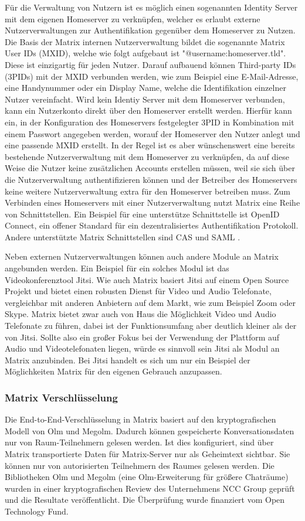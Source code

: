 Für die Verwaltung von Nutzern ist es möglich einen sogenannten Identity Server mit dem eigenen Homeserver zu verknüpfen, welcher es erlaubt externe Nutzerverwaltungen zur Authentifikation gegenüber dem Homeserver zu Nutzen. Die Basis der Matrix internen Nutzerverwaltung bildet die sogenannte Matrix User IDs (MXID), welche wie folgt aufgebaut ist "@username:homeserver.tld". Diese ist einzigartig für jeden Nutzer. Darauf aufbauend können Third-party IDs (3PIDs) mit der MXID verbunden werden, wie zum Beispiel eine E-Mail-Adresse, eine Handynummer oder ein Display Name, welche die Identifikation einzelner Nutzer vereinfacht. Wird kein Identiy Server mit dem Homeserver verbunden, kann ein Nutzerkonto direkt über den Homeserver erstellt werden. Hierfür kann ein, in der Konfiguration des Homeservers festgelegter 3PID in Kombination mit einem Passwort angegeben werden, worauf der Homeserver den Nutzer anlegt und eine passende MXID erstellt. In der Regel ist es aber wünschenswert eine bereits bestehende Nutzerverwaltung mit dem Homeserver zu verknüpfen, da auf diese Weise die Nutzer keine zusätzlichen Accounts erstellen müssen, weil sie sich über die Nutzerverwaltung authentifizieren können und der Betreiber des Homeservers keine weitere Nutzerverwaltung extra für den Homeserver betreiben muss. Zum Verbinden eines Homeservers mit einer Nutzerverwaltung nutzt Matrix eine Reihe von Schnittstellen. Ein Beispiel für eine unterstütze Schnittstelle ist OpenID Connect, ein offener Standard für ein dezentralisiertes Authentifikation Protokoll. Andere unterstützte Matrix Schnittstellen sind CAS und SAML .

Neben externen Nutzerverwaltungen können auch andere Module an Matrix angebunden werden. Ein Beispiel für ein solches Modul ist das Videokonferenztool Jitsi. Wie auch Matrix basiert Jitsi auf einem Open Source Projekt und bietet einen robusten Dienst für Video und Audio Telefonate, vergleichbar mit anderen Anbietern auf dem Markt, wie zum Beispiel Zoom oder Skype. Matrix bietet zwar auch von Haus die Möglichkeit Video und Audio Telefonate zu führen, dabei ist der Funktionsumfang aber deutlich kleiner als der von Jitsi. Sollte also ein großer Fokus bei der Verwendung der Plattform auf Audio und Videotelefonaten liegen, würde es sinnvoll sein Jitsi als Modul an Matrix anzubinden. Bei Jitsi handelt es sich um nur ein Beispiel der Möglichkeiten Matrix für den eigenen Gebrauch anzupassen. 

\subsubsection{Matrix Verschlüsselung}\label{chapter:aemn}
Die End-to-End-Verschlüsselung in Matrix basiert auf den kryptografischen Modell von Olm und Megolm.
Dadurch können gespeicherte Konversationsdaten nur von Raum-Teilnehmern gelesen werden. Ist dies konfiguriert, sind über Matrix transportierte Daten für Matrix-Server nur als Geheimtext sichtbar. Sie können nur von autorisierten Teilnehmern des Raumes gelesen werden. Die Bibliotheken Olm und Megolm (eine Olm-Erweiterung für größere Chaträume) wurden in einer kryptografischen Review des Unternehmens NCC Group geprüft und die Resultate veröffentlicht. Die Überprüfung wurde finanziert vom Open Technology Fund.


